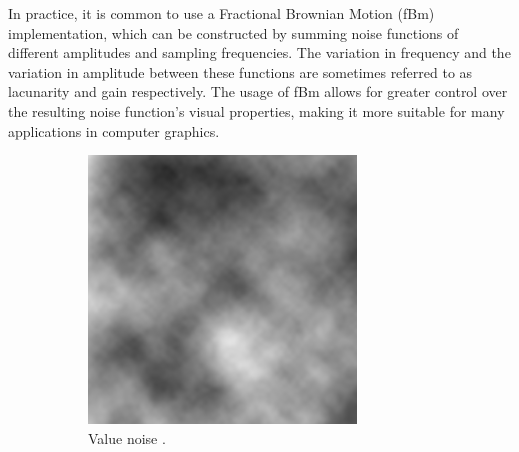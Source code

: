 In practice, it is common to use a Fractional Brownian Motion (fBm) implementation, which can be constructed by summing noise functions of different amplitudes and sampling frequencies.
The variation in frequency and the variation in amplitude between these functions are sometimes referred to as lacunarity and gain respectively.
The usage of fBm allows for greater control over the resulting noise function's visual properties, making it more suitable for many applications in computer graphics.

\begin{figure}[h!]
  \centering
  \begin{subfigure}[b]{0.30\textwidth}
    \includegraphics[width=\textwidth]{figure/value_noise.png}
    \caption{Value noise \cite{value_noise_img}.}
  \end{subfigure}
  \quad
  \quad
  \quad
  \begin{subfigure}[b]{0.30\textwidth}

\end{subfigure}
\end{figure}
